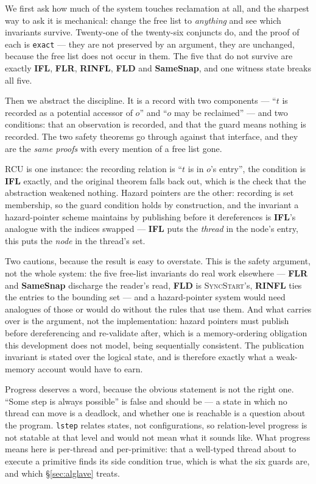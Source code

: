 We first ask how much of the system touches reclamation at all, and the sharpest
way to ask it is mechanical: change the free list to \emph{anything} and see
which invariants survive.  Twenty-one of the twenty-six conjuncts do, and the
proof of each is \texttt{exact} --- they are not preserved by an argument, they
are unchanged, because the free list does not occur in them.  The five that do
not survive are exactly \textbf{IFL}, \textbf{FLR}, \textbf{RINFL},
\textbf{FLD} and \textbf{SameSnap}, and one witness state breaks all five.

Then we abstract the discipline.  It is a record with two components --- ``$t$
is recorded as a potential accessor of $o$'' and ``$o$ may be reclaimed'' ---
and two conditions: that an observation is recorded, and that the guard means
nothing is recorded.  The two safety theorems go through against that interface,
and they are the \emph{same proofs} with every mention of a free list gone.

RCU is one instance: the recording relation is ``$t$ is in $o$'s entry'', the
condition is \textbf{IFL} exactly, and the original theorem falls back out,
which is the check that the abstraction weakened nothing.  Hazard pointers are
the other: recording is set membership, so the guard condition holds by
construction, and the invariant a hazard-pointer scheme maintains by publishing
before it dereferences is \textbf{IFL}'s analogue with the indices swapped ---
\textbf{IFL} puts the \emph{thread} in the node's entry, this puts the
\emph{node} in the thread's set.

Two cautions, because the result is easy to overstate.  This is the safety
argument, not the whole system: the five free-list invariants do real work
elsewhere --- \textbf{FLR} and \textbf{SameSnap} discharge the reader's read,
\textbf{FLD} is \textsc{SyncStart}'s, \textbf{RINFL} ties the entries to the
bounding set --- and a hazard-pointer system would need analogues of those or
would do without the rules that use them.  And what carries over is the
argument, not the implementation: hazard pointers must publish before
dereferencing and re-validate after, which is a memory-ordering obligation this
development does not model, being sequentially consistent.  The publication
invariant is stated over the logical state, and is therefore exactly what a
weak-memory account would have to earn.

Progress deserves a word, because the obvious statement is not the right one.
``Some step is always possible'' is false and should be --- a state in which no
thread can move is a deadlock, and whether one is reachable is a question about
the program.  \texttt{lstep} relates states, not configurations, so
relation-level progress is not statable at that level and would not mean what it
sounds like.  What progress means here is per-thread and per-primitive: that a
well-typed thread about to execute a primitive finds its side condition true,
which is what the six guards are, and which \S\ref{sec:alglave} treats.

